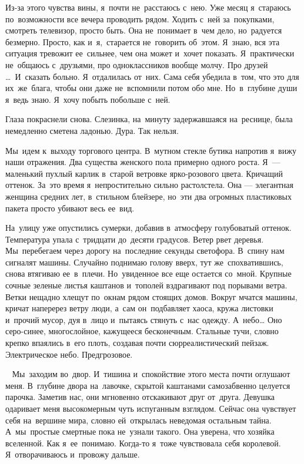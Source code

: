 Из-за этого чувства вины, я~почти не~расстаюсь с~нею.
Уже месяц я~стараюсь по~возможности все вечера проводить рядом.
Ходить с~ней за~покупками, смотреть телевизор, просто быть.
Она не~понимает в~чем дело, но~радуется безмерно.
Просто, как и~я,~старается не~говорить об~этом.
Я~знаю, вся эта ситуация тревожит ее~сильнее, чем она может и~хочет показать.
Я~практически не~общаюсь с~друзьями, про одноклассников вообще молчу.
Про друзей …~И~сказать больно.
Я~отдалилась от~них.
Сама себя убедила в~том, что это для их~же~блага, чтобы они даже не~вспомнили потом обо мне.
Но~в~глубине души я~ведь знаю.
Я~хочу побыть побольше с~ней.
 
Глаза покраснели снова.
Слезинка, на~минуту задержавшаяся на~реснице, была немедленно сметена ладонью.
Дура.
Так нельзя.
 
Мы~идем к~выходу торгового центра.
В~мутном стекле бутика напротив я~вижу наши отражения.
Два существа женского пола примерно одного роста.
Я~--- маленький пухлый карлик в~старой ветровке ярко-розового цвета.
Кричащий оттенок.
За~это время я~непростительно сильно растолстела.
Она --- элегантная женщина средних лет, в~стильном блейзере, но~эти два огромных пластиковых пакета просто убивают весь ее~вид.
 
На~улицу уже опустились сумерки, добавив в~атмосферу голубоватый оттенок.
Температура упала с~тридцати до~десяти градусов.
Ветер рвет деревья.
Мы~перебегаем через дорогу на~последние секунды светофора.
В~спину нам сигналят машины.
Случайно поднимаю голову вверх, тут же~спохватившись, снова втягиваю ее~в~плечи.
Но~увиденное все еще остается со~мной.
Крупные сочные зеленые листья каштанов и~тополей вздрагивают под порывами ветра.
Ветки нещадно хлещут по~окнам рядом стоящих домов.
Вокруг мчатся машины, кричат наперерез ветру люди, а~сам он~подбавляет хаоса, кружа листовки и~прочий мусор, дуя в~лицо и~пытаясь стянуть с~нас одежду.
А~небо… Оно серо-синее, многослойное, кажущееся бесконечным.
Стальные тучи, словно крепко впаялись в~его плоть, создавая почти сюрреалистический пейзаж.
Электрическое небо.
Предгрозовое.

~
Мы~заходим во~двор.
И~тишина и~спокойствие этого места почти оглушают меня.
В~глубине двора на~лавочке, скрытой каштанами самозабвенно целуется парочка.
Заметив нас, они мгновенно отскакивают друг от~друга.
Девушка одаривает меня высокомерным чуть испуганным взглядом.
Сейчас она чувствует себя на~вершине мира, словно ей~открылась неведомая остальным тайна.
А~мы~простые смертные пока не~узнали такого.
Она уверена, что хозяйка вселенной.
Как я~ее~понимаю.
Когда-то я~тоже чувствовала себя королевой.
Я~отворачиваюсь и~провожу дальше.

